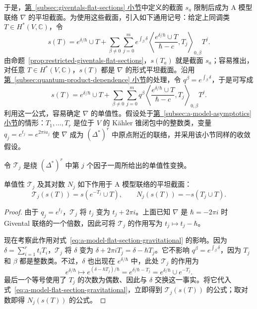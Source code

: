 于是，\hyperref[subsec:giventals-flat-sections]{第~\ref*{subsec:giventals-flat-sections} 小节}中定义的截面 $s_a$ 限制后成为 A 模型联络 $\nabla$ 的平坦截面。为使用这些截面，引入如下通用记号：给定上同调类 $T\in H^*(V,\mathbb C)$，令
\[
s(T)=e^{\delta/\hbar}\cup T
+\sum_{\beta\ne0}\sum_{j=0}^m e^{\int_\beta\delta}
\left\langle\frac{e^{\delta/\hbar}\cup T}{\hbar-c},T_j\right\rangle_{0,\beta}T^j.
\]
由命题~\ref{prop:restricted-giventals-flat-sections}，$s(T_a)$ 就是截面 $s_a$；容易推出，对任意 $T\in H^*(V,\mathbb C)$，$s(T)$ 都是 $\nabla$ 的形式平坦截面。沿用\hyperref[subsec:quantum-product-dependence]{第~\ref*{subsec:quantum-product-dependence} 小节}的处理，令 $q^\beta=e^{\int_\beta\delta}$，于是可写成
\begin{equation}\label{eq:a-model-flat-section-gravitational}
s(T)=e^{\delta/\hbar}\cup T
+\sum_{\beta\ne0}\sum_{j=0}^m q^\beta
\left\langle\frac{e^{\delta/\hbar}\cup T}{\hbar-c},T_j\right\rangle_{0,\beta}T^j.
\end{equation}
利用这一公式，容易确定 $\nabla$ 的单值性。假设处于\hyperref[subsec:a-model-asymptotics]{第~\ref*{subsec:a-model-asymptotics} 小节}的情形：$T_1,\ldots,T_r$ 是位于 $V$ 的 Kähler 锥闭包中的整数类，变量 $q_j=e^{t_j}=e^{2\pi iu_j}$ 使 $\nabla$ 成为 $(\Delta^*)^r$ 中原点附近的联络，并采用该小节同样的收敛假设。

令 $\mathcal T_j$ 是绕 $(\Delta^*)^r$ 中第 $j$ 个因子一周所给出的单值性变换。
\begin{theorem}\label{thm:a-model-gravitational-monodromy}
单值性 $\mathcal T_j$ 及其对数 $N_j$ 如下作用于 A 模型联络的平坦截面：
\[
\mathcal T_j(s(T))=s(e^{-T_j}\cup T),
\qquad N_j(s(T))=-s(T_j\cup T).
\]
\end{theorem}
\begin{proof}
由于 $q_j=e^{t_j}$，$\mathcal T_j$ 将 $t_j$ 变为 $t_j+2\pi i$。上面已知 $\nabla$ 是 $\hbar=-2\pi i$ 时 Givental 联络的一个倍数，因此可将 $\mathcal T_j$ 的作用写为 $t_j\mapsto t_j-\hbar$。

现在考察此作用对式~\eqref{eq:a-model-flat-section-gravitational} 的影响。因为 $\delta=\sum_{i=1}^rt_iT_i$，$\mathcal T_j$ 将 $\delta$ 变为 $\delta+2\pi iT_j=\delta-\hbar T_j$。它不影响 $q^\beta=e^{\int_\beta\delta}$，因为 $T_j$ 和 $\beta$ 都是整数类。不过，$\delta$ 也出现在 $e^{\delta/\hbar}$ 中，此处 $\mathcal T_j$ 的作用为
\[
e^{\delta/\hbar}\longmapsto
e^{(\delta-\hbar T_j)/\hbar}
=e^{\delta/\hbar-T_j}=e^{\delta/\hbar}\cup e^{-T_j}.
\]
最后一个等号使用了 $T_j$ 的次数为偶数、因此与 $\delta$ 交换这一事实。将它代入式~\eqref{eq:a-model-flat-section-gravitational}，立即得到 $\mathcal T_j(s(T))$ 的公式；取对数即得 $N_j(s(T))$ 的公式。
\end{proof}

